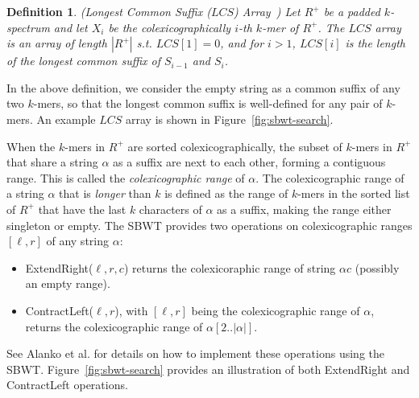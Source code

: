 \documentclass[unnumsec,webpdf,contemporary,large]{oup-authoring-template}%
\theoremstyle{thmstyleone}%
\theoremstyle{thmstyletwo}%
\theoremstyle{thmstylethree}%
\newtheorem{definition}{Definition}
\begin{document}
\begin{definition}\label{def:LCS-array}(Longest Common Suffix ($LCS$) Array~\cite{alanko2023longest})     
Let $R^+$ be a padded $k$-spectrum and let $X_i$ be the colexicographically $i$-th $k$-mer of $R^+$. 
The $LCS$ array is an array of length $|R^+|$ s.t. $LCS[1] = 0$, and for $i > 1$, $LCS[i]$ is the length of the longest common suffix of $S_{i-1}$ and $S_i$.
\end{definition}
 In the above definition, we consider the empty string as a common suffix of any two $k$-mers, so that the longest common suffix is well-defined for any pair of $k$-mers.
An example $LCS$ array is shown in Figure~\ref{fig:sbwt-search}.

When the $k$-mers in $R^+$ are sorted colexicographically, the subset of $k$-mers in $R^+$ that share a string $\alpha$ as a suffix are next to each other, forming a contiguous range. This is called the \emph{colexicographic range} of $\alpha$. The colexicographic range of a string $\alpha$ that is \emph{longer} than $k$ is defined as the range of $k$-mers in the sorted list of $R^+$ that have the last $k$ characters of $\alpha$ as a suffix, making the range either singleton or empty. %
The SBWT provides two operations on colexicographic ranges $[\ell, r]$ of any string $\alpha$: 

\begin{itemize}
\item ExtendRight($\ell, r, c$) returns the colexicoraphic range of string $\alpha c$ (possibly an empty range).
\item ContractLeft($\ell, r$), with $[\ell, r]$ being the colexicographic range of $\alpha$, returns the colexicographic range of $\alpha[2..|\alpha|]$.
\end{itemize}

See Alanko et al. \cite{alanko2024finimizers} for details on how to implement these operations using the SBWT. Figure~\ref{fig:sbwt-search} provides an illustration of both ExtendRight and ContractLeft operations.

\end{document}
